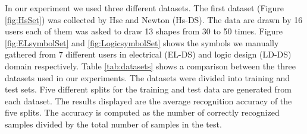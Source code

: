 \documentclass[preprint,1p,times,review]{elsarticle}
\begin{document}
In our experiment we used three different datasets. The first dataset (Figure \ref{fig:HsSet}) was collected by Hse and Newton\cite{HeloiseBeautification} (Hs-DS). The data are drawn by 16 users each of them was asked to draw 13 shapes from 30 to 50 times. Figure \ref{fig:ELsymbolSet} and \ref{fig:LogicsymbolSet} shows the symbols we manually gathered from 7 different users in electrical (EL-DS) and logic design (LD-DS) domain respectively.  Table \ref{tab:datasets} shows a comparison between the three datasets used in our experiments. The datasets were divided into training and test sets. Five different splits for the training and test data are generated from each dataset. The results displayed are the average recognition accuracy of the five splits. The accuracy is computed as the number of correctly recognized samples divided by the total number of samples in the test.
\end{document}
